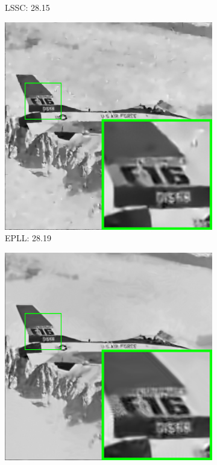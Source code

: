 \begin{figure}
\begin{subfigure}[t]{0.24\textwidth}
		\caption{LSSC: 28.15}
    \end{subfigure}
    \hfill
    \begin{subfigure}[t]{0.24\textwidth}
        \centering
        \includegraphics[width=1\textwidth]{images/pgpd/br_EPLL_50_airplane.png}
		\caption{EPLL: 28.19}
    \end{subfigure}
    \hfill
    \begin{subfigure}[t]{0.24\textwidth}
        \centering
        \includegraphics[width=1\textwidth]{images/pgpd/br_NCSR_50_airplane.png}

\end{subfigure}
\end{figure}
